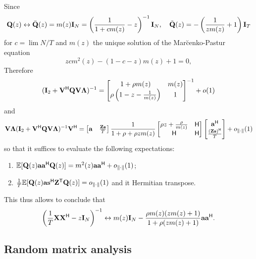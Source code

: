\documentclass[11pt,a4paper]{article}
\begin{document}
Since
\begin{equation}
	{\mathbf{Q}}(z) \leftrightarrow \bar {{\mathbf{Q}}}(z) = m(z) \mathbf{I}_N = \left(  \frac1{1 + c m(z)} - z \right)^{-1} \mathbf{I}_N, \quad \tilde {{\mathbf{Q}}}(z) = - \left(\frac1{z m(z)}+1\right) \mathbf{I}_T
\end{equation}
for $c = \lim N/T$ and $m(z)$ the unique solution of the Mar{\u c}enko-Pastur equation
\begin{equation}
	z c m^2(z) - (1 - c -z) m(z) + 1 = 0,
\end{equation}
Therefore
\begin{equation}
	(\mathbf{I}_2 + \mathbf{V}^{\sf H} {\mathbf{Q}} \mathbf{V} \boldsymbol{\Lambda})^{-1} = \begin{bmatrix} 1 + \rho m(z) & m(z) \\ \rho \left( 1 - z - \frac1{m(z)} \right) & 1   \end{bmatrix}^{-1} + o(1)
\end{equation}
and 
\begin{equation}
	\mathbf{V} \boldsymbol{\Lambda} (\mathbf{I}_2 + \mathbf{V}^{\sf H} {\mathbf{Q}} \mathbf{V} \boldsymbol{\Lambda})^{-1} \mathbf{V}^{\sf H} = \begin{bmatrix}\mathbf{a} & \frac{{\mathbf{Z}} \mathbf{s}}{T}\end{bmatrix} \frac1{1 + \rho +\rho z m (z)} \begin{bmatrix} \rho z + \frac{\rho}{m(z)} & {\sf H} \\ {\sf H} & {\sf H} \end{bmatrix} \begin{bmatrix}\mathbf{a}^{\sf H} \\ \frac{({\mathbf{Z}} \mathbf{s})^{\sf H}}{T}\end{bmatrix} + o_{\| \cdot \|} (1)
\end{equation}
so that it suffices to evaluate the following expectations:
\begin{enumerate}
 	\item ${\mathbb{E}}[{\mathbf{Q}}(z) \mathbf{a} \mathbf{a}^{\sf H} {\mathbf{Q}}(z)] = m^2(z) \mathbf{a} \mathbf{a}^{\sf H} + o_{\| \cdot \|}(1)$;
 	\item $\frac1T {\mathbb{E}}[{\mathbf{Q}}(z) \mathbf{a} \mathbf{s}^{\sf H} {\mathbf{Z}}^{\sf T} {\mathbf{Q}}(z)] = o_{\| \cdot \|}(1)$ and it Hermitian transpose.
 \end{enumerate}
This thus allows to conclude that
\begin{equation}
	\left(\frac1T {\mathbf{X}} {\mathbf{X}}^{\sf H} - z \mathbf{I}_N \right)^{-1} \leftrightarrow m(z) \mathbf{I}_N - \frac{\rho m(z) (z m(z) + 1)}{1+\rho (z m(z)+1)} \mathbf{a} \mathbf{a}^{\sf H}.
\end{equation}







\subsection{Random matrix analysis}
\end{document}
